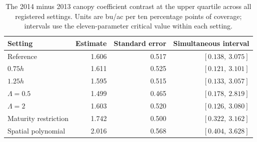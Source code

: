 \begin{table}[t]
\centering
\small
\caption{The 2014 minus 2013 canopy coefficient contrast at the upper quartile across all registered settings. Units are bu/ac per ten percentage points of coverage; intervals use the eleven-parameter critical value within each setting.}
\label{tab:soy-contrast-sensitivity}
\begin{tabular}{lrrr}
\toprule
Setting & Estimate & Standard error & Simultaneous interval \\
\midrule
Reference & 1.606 & 0.517 & $[0.138,\ 3.075]$ \\
$0.75h$ & 1.611 & 0.525 & $[0.121,\ 3.101]$ \\
$1.25h$ & 1.595 & 0.515 & $[0.133,\ 3.057]$ \\
$\Lambda=0.5$ & 1.499 & 0.465 & $[0.178,\ 2.819]$ \\
$\Lambda=2$ & 1.603 & 0.520 & $[0.126,\ 3.080]$ \\
Maturity restriction & 1.742 & 0.500 & $[0.322,\ 3.162]$ \\
Spatial polynomial & 2.016 & 0.568 & $[0.404,\ 3.628]$ \\
\bottomrule
\end{tabular}
\end{table}

